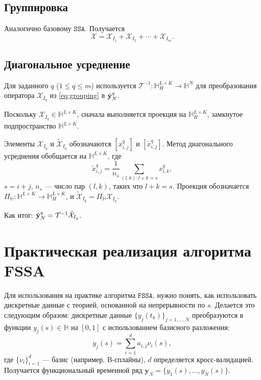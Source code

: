 \documentclass[12pt, specialist, subf
]{disser}
\theoremstyle{definition}
\newcommand{\SSA}{\texttt{SSA}}
\newcommand{\FSSA}{\texttt{FSSA}}
\begin{document}
\subsection*{Группировка}

Аналогично базовому $\SSA$. Получается
\begin{equation}\label{eq:grouping}
	\mathcal{X}=\mathcal{X}_{I_1}+\mathcal{X}_{I_2}+\cdots+\mathcal{X}_{I_m}.
\end{equation}


\subsection*{Диагональное усреднение}

Для заданного $q$ ($1\leq q\leq m$) используется $\mathcal{T}^{-1}:\mathbb{H}_H^{L\times K}\to\mathbb{H}^N$ для преобразования оператора $\mathcal{X}_{I_q}$ из \eqref{eq:grouping} в $\tilde{\bf y}_N^q$.

Поскольку $\mathcal{X}_{I_q}\in\mathbb{H}^{L\times K}$, сначала выполняется проекция на $\mathbb{H}_H^{L\times K}$, замкнутое подпространство $\mathbb{H}^{L\times K}$.

Элементы $\mathcal{X}_{I_q}$ и $\tilde{\mathcal{X}}_{I_q}$ обозначаются $[x_{i,j}^{q}]$ и $[\tilde{x}_{i,j}^{q}]$. Метод диагонального усреднения  обобщается на $\mathbb{H}^{L\times K}$, где
\begin{equation}\label{fdiag-ave}
	\tilde{x}_{i,j}^{q}=\frac{1}{n_s}\sum_{(l,k): l+k=s} x_{l,k}^q,
\end{equation}
$s=i+j$, $n_s$ — число пар $(l,k)$, таких что $l+k=s$. Проекция обозначается $\Pi_\mathbb{H}:\mathbb{H}^{L\times K}\to\mathbb{H}_H^{L\times K}$, и $\tilde{\mathcal{X}}_{I_q}=\Pi_\mathbb{H} \mathcal{X}_{I_q}$.

Как итог: $\tilde{\bf y}_N^q=\mathcal{T}^{-1}\tilde{\mathcal{X}}_{I_q}$.


\section{Практическая реализация алгоритма FSSA}

Для использования на практике алгоритма $\FSSA$, нужно понять, как использовать дискретные данные с теорией, основанной на непрерывности по $s$. Делается это следующим образом:
дискретные данные \( \{y_j(t_k)\}_{j=1,\dots,N} \) преобразуются в функции \( y_j(s) \in \mathbb{H} \) на \( [0,1] \) с использованием базисного разложения:
\[
y_j(s) = \sum_{i=1}^d a_{i,j} \nu_i(s),
\]
где \( \{\nu_i\}_{i=1}^d \) — базис (например, B-сплайны), \( d \) определяется кросс-валидацией. Получается функциональный временной ряд \( \mathbf{y}_N = \{y_1(s), \dots, y_N(s)\} \).
\end{document}

